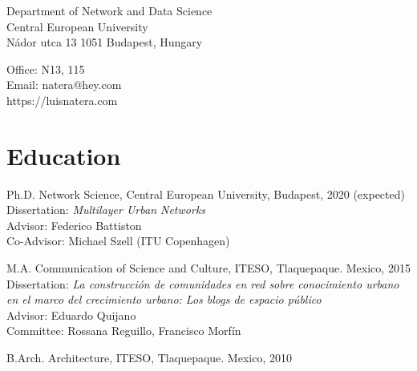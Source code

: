 \documentclass{academiccv}
\begin{document}
\raggedright

\namefont{\myname}

\vspace{1em}
\begin{minipage}[t]{0.495\textwidth}
  Department of Network and Data Science \\
  Central European University \\
  Nádor utca 13
  1051 Budapest, Hungary
\end{minipage}
\begin{minipage}[t]{0.495\textwidth}
  Office: N13, 115 \\
  Email: natera@hey.com \\
  https://luisnatera.com \\\textbf{}
\end{minipage}
\vspace{0.5em}

\textbf{}

\section*{Education}
\begin{tablist}
	\item[Ph.D. ] \tab Network Science, Central European University, Budapest, 2020 (expected) \\
                  Dissertation: \textit{Multilayer Urban Networks} \\
                  Advisor: Federico Battiston \\
                  Co-Advisor: Michael Szell (ITU Copenhagen)
	\item[M.A.]  \tab Communication of Science and Culture, ITESO, Tlaquepaque. Mexico, 2015 \\
					Dissertation: \textit{La construcción de comunidades en red sobre conocimiento urbano en el marco del crecimiento urbano: Los blogs de espacio público}\\
					Advisor: Eduardo Quijano \\
					Committee: Rossana Reguillo, Francisco Morfín
	\item[B.Arch.]  \tab Architecture,  ITESO, Tlaquepaque. Mexico, 2010
\end{tablist}
\end{document}
